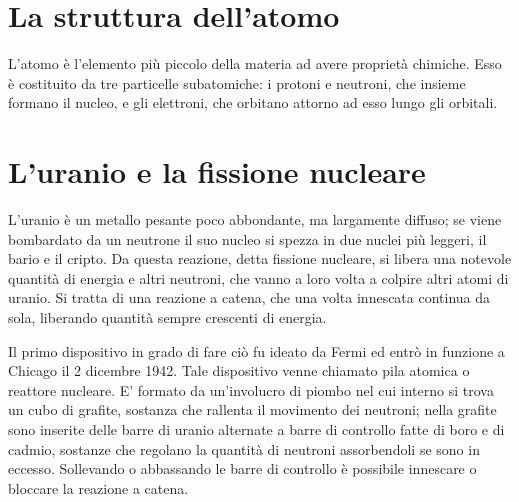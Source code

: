 \section{La struttura dell'atomo}
L'atomo  è l'elemento più piccolo della materia ad avere proprietà chimiche. Esso è costituito da tre particelle subatomiche: i protoni e neutroni, che insieme formano il nucleo, e gli elettroni, che orbitano attorno ad esso lungo gli orbitali.

\section{L'uranio e la fissione nucleare}
L'uranio è un metallo pesante poco abbondante, ma largamente diffuso; se viene bombardato da un neutrone il suo nucleo si spezza in due nuclei più leggeri, il bario e il cripto. Da questa reazione, detta fissione nucleare, si libera una notevole quantità di energia e altri neutroni, che vanno a loro volta a colpire altri atomi di uranio. Si tratta di una reazione a catena, che una volta innescata continua da sola, liberando quantità sempre crescenti di energia.

Il primo dispositivo in grado di fare ciò fu ideato da Fermi ed entrò in funzione a Chicago il 2 dicembre 1942. Tale dispositivo venne chiamato pila atomica o reattore nucleare. E' formato da un'involucro di piombo nel cui interno si trova un cubo di grafite, sostanza che rallenta il movimento dei neutroni; nella grafite sono inserite delle barre di uranio alternate a barre di controllo fatte di boro e di cadmio, sostanze che regolano la quantità di neutroni assorbendoli se sono in eccesso. Sollevando o abbassando le barre di controllo è possibile innescare o bloccare la reazione a catena.
